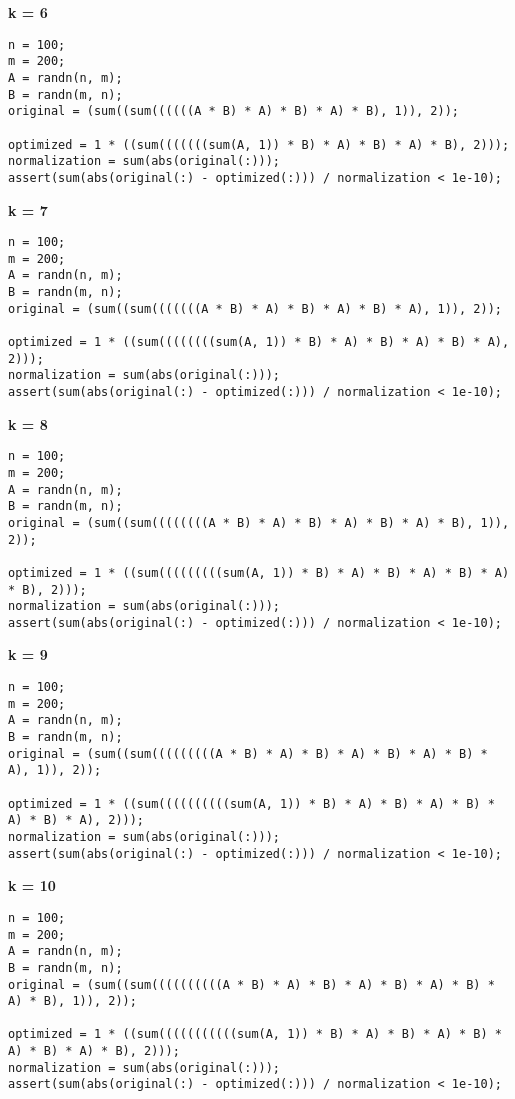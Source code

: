 {\bf k = 6}

\begin{lstlisting}
n = 100;
m = 200;
A = randn(n, m);
B = randn(m, n);
original = (sum((sum((((((A * B) * A) * B) * A) * B), 1)), 2));

optimized = 1 * ((sum(((((((sum(A, 1)) * B) * A) * B) * A) * B), 2)));
normalization = sum(abs(original(:)));
assert(sum(abs(original(:) - optimized(:))) / normalization < 1e-10);
\end{lstlisting}


{\bf k = 7}

\begin{lstlisting}
n = 100;
m = 200;
A = randn(n, m);
B = randn(m, n);
original = (sum((sum(((((((A * B) * A) * B) * A) * B) * A), 1)), 2));

optimized = 1 * ((sum((((((((sum(A, 1)) * B) * A) * B) * A) * B) * A), 2)));
normalization = sum(abs(original(:)));
assert(sum(abs(original(:) - optimized(:))) / normalization < 1e-10);
\end{lstlisting}


{\bf k = 8}

\begin{lstlisting}
n = 100;
m = 200;
A = randn(n, m);
B = randn(m, n);
original = (sum((sum((((((((A * B) * A) * B) * A) * B) * A) * B), 1)), 2));

optimized = 1 * ((sum(((((((((sum(A, 1)) * B) * A) * B) * A) * B) * A) * B), 2)));
normalization = sum(abs(original(:)));
assert(sum(abs(original(:) - optimized(:))) / normalization < 1e-10);
\end{lstlisting}


{\bf k = 9}

\begin{lstlisting}
n = 100;
m = 200;
A = randn(n, m);
B = randn(m, n);
original = (sum((sum(((((((((A * B) * A) * B) * A) * B) * A) * B) * A), 1)), 2));

optimized = 1 * ((sum((((((((((sum(A, 1)) * B) * A) * B) * A) * B) * A) * B) * A), 2)));
normalization = sum(abs(original(:)));
assert(sum(abs(original(:) - optimized(:))) / normalization < 1e-10);
\end{lstlisting}


{\bf k = 10}

\begin{lstlisting}
n = 100;
m = 200;
A = randn(n, m);
B = randn(m, n);
original = (sum((sum((((((((((A * B) * A) * B) * A) * B) * A) * B) * A) * B), 1)), 2));

optimized = 1 * ((sum(((((((((((sum(A, 1)) * B) * A) * B) * A) * B) * A) * B) * A) * B), 2)));
normalization = sum(abs(original(:)));
assert(sum(abs(original(:) - optimized(:))) / normalization < 1e-10);
\end{lstlisting}


